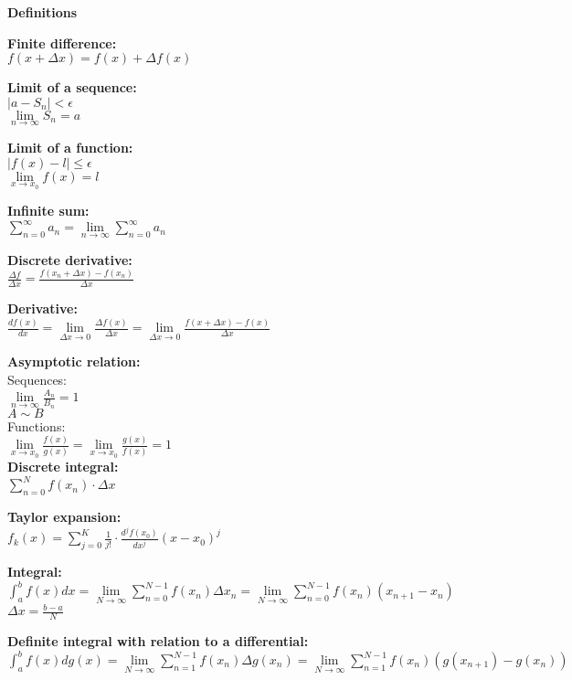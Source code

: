 \documentclass[12pt,a4paper]{report}
\begin{document}
	
	\begin{center}\textbf{Definitions}\end{center}
	
	\textbf{Finite difference:}\\
	$f(x + \Delta x) = f(x) + \Delta f(x)$
	
	\textbf{Limit of a sequence:}\\	
	$|a - S_n| < \epsilon$\\
	$\lim\limits_{n \to \infty} S_n = a$

	\textbf{Limit of a function:}\\
	$|f(x) - l| \leq \epsilon$\\
	$\lim\limits_{x \to x_0} f(x) = l$
	
	\textbf{Infinite sum:}\\
	$\sum_{n = 0}^{\infty} a_n = \lim\limits_{n \to \infty} \sum_{n = 0}^{\infty} a_n$
	
	\textbf{Discrete derivative:}\\
	$\frac{\Delta f}{\Delta x} = \frac{f(x_n + \Delta x) - f(x_n)}{\Delta x}$
	
	\textbf{Derivative:}\\
	$\frac{df(x)}{dx} = \lim\limits_{\Delta x \to 0} \frac{\Delta f(x)}{\Delta x} = \lim\limits_{\Delta x \to 0} \frac{f(x + \Delta x) - f(x)}{\Delta x}$
	
	\textbf{Asymptotic relation:}\\
	Sequences:\\
	$\lim\limits_{n \to \infty} \frac{A_n}{B_n} = 1$\\
	$A \sim B$\\
	Functions:\\
	$\lim\limits_{x \to x_0} \frac{f(x)}{g(x)} = \lim\limits_{x \to x_0} \frac{g(x)}{f(x)} = 1$\\
	
	\textbf{Discrete integral:}\\
	$\sum_{n = 0}^{N} f(x_n) \cdot \Delta x$
	
	\textbf{Taylor expansion:}\\
	$f_k(x) = \sum_{j = 0}^{K} \frac{1}{j!} \cdot \frac{d^j f(x_0)}{dx^j}(x - x_0)^j$
	
	\textbf{Integral:}\\
	$\int_{a}^{b} f(x) dx = \lim\limits_{N \to \infty} \sum_{n = 0}^{N - 1} f(x_n) \Delta x_n = \lim\limits_{N \to \infty} \sum_{n = 0}^{N - 1} f(x_n)(x_{n+1} - x_n)$\\
	$\Delta x = \frac{b - a}{N}$
	
	\textbf{Definite integral with relation to a differential:}\\
	$\int_{a}^{b} f(x)dg(x) = \lim\limits_{N \to \infty} \sum_{n = 1}^{N - 1} f(x_n)\Delta g(x_n) = \lim\limits_{N \to \infty} \sum_{n = 1}^{N - 1} f(x_n)(g(x_{n+1}) - g(x_n))$
	
\end{document}

